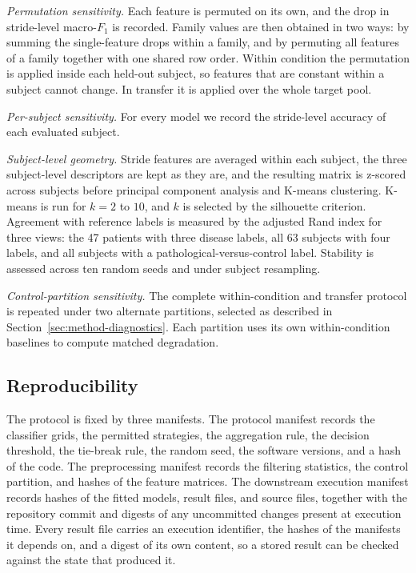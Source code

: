 \documentclass[conference]{IEEEtran}
\begin{document}
\textit{Permutation sensitivity.} Each feature is permuted on its own, and the drop in stride-level macro-$F_1$ is recorded. Family values are then obtained in two ways: by summing the single-feature drops within a family, and by permuting all features of a family together with one shared row order. Within condition the permutation is applied inside each held-out subject, so features that are constant within a subject cannot change. In transfer it is applied over the whole target pool.

\textit{Per-subject sensitivity.} For every model we record the stride-level accuracy of each evaluated subject.

\textit{Subject-level geometry.} Stride features are averaged within each subject, the three subject-level descriptors are kept as they are, and the resulting matrix is z-scored across subjects before principal component analysis and K-means clustering. K-means is run for $k=2$ to $10$, and $k$ is selected by the silhouette criterion. Agreement with reference labels is measured by the adjusted Rand index for three views: the 47 patients with three disease labels, all 63 subjects with four labels, and all subjects with a pathological-versus-control label. Stability is assessed across ten random seeds and under subject resampling.

\textit{Control-partition sensitivity.} The complete within-condition and transfer protocol is repeated under two alternate partitions, selected as described in Section~\ref{sec:method-diagnostics}. Each partition uses its own within-condition baselines to compute matched degradation.

\subsection{Reproducibility}
The protocol is fixed by three manifests. The protocol manifest records the classifier grids, the permitted strategies, the aggregation rule, the decision threshold, the tie-break rule, the random seed, the software versions, and a hash of the code. The preprocessing manifest records the filtering statistics, the control partition, and hashes of the feature matrices. The downstream execution manifest records hashes of the fitted models, result files, and source files, together with the repository commit and digests of any uncommitted changes present at execution time. Every result file carries an execution identifier, the hashes of the manifests it depends on, and a digest of its own content, so a stored result can be checked against the state that produced it.
\end{document}
